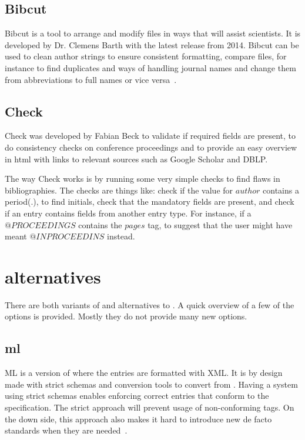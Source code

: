 \subsection{Bibcut}
Bibcut is a tool to arrange and modify {\bibtex} files in ways that
will assist scientists.  It is developed by Dr. Clemens Barth with the
latest release from 2014.  Bibcut can be used to clean author strings
to ensure consistent formatting, compare {\bibtex} files, for instance
to find duplicates and ways of handling journal names and change them
from abbreviations to full names or vice versa~\cite{bibcut_site}.

\subsection{{\bibtex} Check}
{\bibtex} Check was developed by Fabian Beck to validate if required
fields are present, to do consistency checks on conference proceedings
and to provide an easy overview in html with links to relevant sources
such as Google Scholar and DBLP.

The way {\bibtex} Check works is by running some very simple checks to
find flaws in bibliographies.  The checks are things like: check if
the value for $author$ contains a period(.), to find initials, check
that the mandatory fields are present, and check if an entry contains
fields from another entry type.  For instance, if a $@PROCEEDINGS$
contains the $pages$ tag, to suggest that the user might have meant
$@INPROCEEDINS$ instead.


\section{{\bibtex} alternatives}
\label{sec:bibtex_alternatives}
There are both variants of and alternatives to {\bibtex}.  A quick
overview of a few of the options is provided.  Mostly they do not
provide many new options.

\subsection{{\bibtex}ml} {\bibtex}ML is a version of {\bibtex} where
the entries are formatted with XML.  It is by design made with strict
schemas and conversion tools to convert from {\bibtex}.  Having a
system using strict schemas enables enforcing correct entries that
conform to the specification.  The strict approach will prevent usage
of non-conforming tags.  On the down side, this approach also makes it
hard to introduce new de facto standards when they are
needed~\cite{gunhen2007_bibtexml}.


